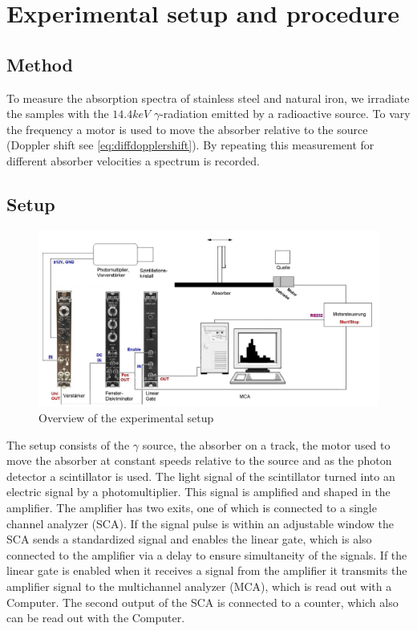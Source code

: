 \section{Experimental setup and procedure}
\subsection{Method}
To measure the absorption spectra of stainless steel and natural iron, we irradiate the samples with the $14.4keV$ $\gamma$-radiation emitted by a radioactive source. To vary the frequency a motor is used to move the absorber relative to the source (Doppler shift see  \ref{eq:diffdopplershift}). By repeating this measurement for different absorber velocities a spectrum is recorded.\\
\subsection{Setup}
\begin{figure}[hbt]
\centering
\includegraphics[width=1.0\linewidth]{graphics/Aufbau}
\caption[Setup overview ]{Overview of the experimental setup}
\label{fig:Aufbau}
\end{figure}

The setup consists of the $\gamma$ source, the absorber on a track, the motor used to move the absorber at constant speeds relative to the source and as the photon detector a scintillator is used. The light signal of the scintillator turned into an electric signal by a photomultiplier. This signal is amplified and shaped in the amplifier. The amplifier has two exits, one of which is connected to a single channel analyzer (SCA). If the signal pulse is within an adjustable window the SCA sends a standardized signal and enables the linear gate, which is also connected to the amplifier via a delay to ensure simultaneity of the signals. If the linear gate is enabled when it receives a signal from the amplifier it transmits the amplifier signal to the multichannel analyzer (MCA), which is read out with a Computer. The second output of the SCA is connected to a counter, which also can be read out with the Computer.

